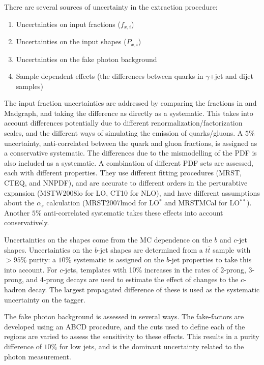 There are several sources of uncertainty in the extraction procedure:

\begin{enumerate}
\item Uncertainties on input fractions ($f_{x,i}$)
\item Uncertainties on the input shapes ($P_{x,i}$) 
\item Uncertainties on the fake photon background
\item Sample dependent effects (the differences between quarks in $\gamma$+jet and dijet samples)
\end{enumerate}

The input fraction uncertainties are addressed by comparing the fractions in \Pythia and {\sc Madgraph}, and taking the difference as directly as a systematic. This takes into account differences potentially due to different renormalization/factorization scales, and the different ways of simulating the emission of quarks/gluons. A $5\%$ uncertainty, anti-correlated between the quark and gluon fractions, is assigned as a conservative systematic. The differences due to the mismodelling of the PDF is also included as a systematic. A combination of different PDF sets are assessed, each with different properties. They use different fitting procedures (MRST, CTEQ, and NNPDF), and are accurate to different orders in the perturabtive expansion (MSTW2008lo for LO, CT10 for NLO), and have different assumptions about the $\alpha_s$ calculation (MRST2007lmod for LO$^*$ and MRSTMCal for LO$^{**}$). Another $5\%$ anti-correlated systematic takes these effects into account conservatively.

Uncertainties on the shapes come from the MC dependence on the $b$ and $c$-jet shapes. Uncertainties on the $b$-jet shapes are determined from a $t\bar{t}$ sample with $> 95\%$ purity: a $10\%$ systematic is assigned on the $b$-jet properties to take this into account. For $c$-jets, templates with 10\% increases in the rates of 2-prong, 3-prong, and 4-prong decays are used to estimate the effect of changes to the $c$-hadron decay. The largest propagated difference of these is used as the systematic uncertainty on the tagger.

The fake photon background is assessed in several ways. The fake-factors are developed using an ABCD procedure, and the cuts used to define each of the regions are varied to assess the sensitivity to these effects. This results in a purity difference of $10\%$ for low \pt jets, and is the dominant uncertainty related to the photon measurement.

